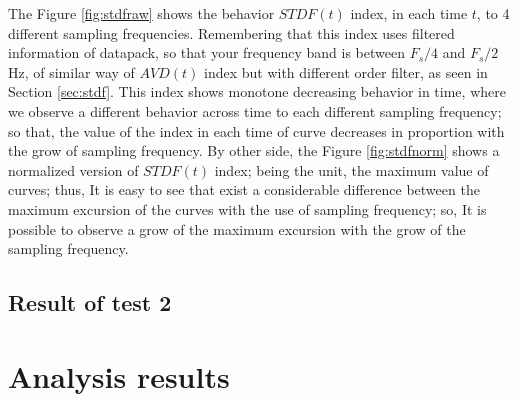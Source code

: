\documentclass[review]{elsarticle}
\begin{document}
The Figure \ref{fig:stdfraw} shows the behavior $STDF(t)$ index, in each time $t$, 
to 4 different sampling frequencies. Remembering that this index uses filtered 
information of datapack, so that your frequency
band is between $F_s/4$ and $F_s/2$ Hz, of similar way of $AVD(t)$ index but with
different order filter, as seen in Section \ref{sec:stdf}.
This index shows monotone decreasing behavior in time, where we observe 
a different behavior across time to each different sampling frequency;
so that, the value of the index in each time of curve decreases in proportion with 
the grow of sampling frequency. By other side,
the Figure \ref{fig:stdfnorm} shows a normalized version of $STDF(t)$ index;
being the unit, the maximum value of curves; thus,
It is easy to see that exist a considerable difference between the maximum excursion 
of the curves with the use of sampling frequency; so, It is possible to observe a 
grow of the maximum excursion with the grow of the sampling frequency.


\subsection{Result of test 2}
\label{subsec:resulttest2}


\section{Analysis results} 
\label{sec:analysisresults}
\end{document}
